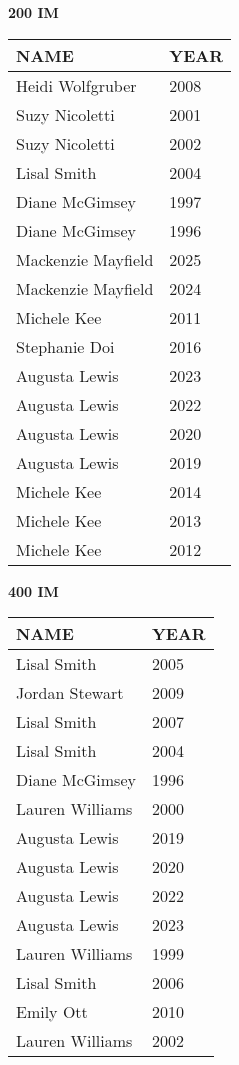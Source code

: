\vspace{0.4cm}

\begin{minipage}[t]{0.48\textwidth}
\centering
\textbf{200 IM}\\[0.05cm]
\begin{tabular}{@{}p{2.8cm}p{1.2cm}@{}}
\hline
\textbf{NAME} & \textbf{YEAR} \\
\hline
Heidi Wolfgruber & 2008 \\
Suzy Nicoletti & 2001 \\
Suzy Nicoletti & 2002 \\
Lisal Smith & 2004 \\
Diane McGimsey & 1997 \\
Diane McGimsey & 1996 \\
Mackenzie Mayfield & 2025 \\
Mackenzie Mayfield & 2024 \\
Michele Kee & 2011 \\
Stephanie Doi & 2016 \\
Augusta Lewis & 2023 \\
Augusta Lewis & 2022 \\
Augusta Lewis & 2020 \\
Augusta Lewis & 2019 \\
Michele Kee & 2014 \\
Michele Kee & 2013 \\
Michele Kee & 2012 \\
\hline
\end{tabular}
\end{minipage}\hfill
\begin{minipage}[t]{0.48\textwidth}
\centering
\textbf{400 IM}\\[0.05cm]
\begin{tabular}{@{}p{2.8cm}p{1.2cm}@{}}
\hline
\textbf{NAME} & \textbf{YEAR} \\
\hline
Lisal Smith & 2005 \\
Jordan Stewart & 2009 \\
Lisal Smith & 2007 \\
Lisal Smith & 2004 \\
Diane McGimsey & 1996 \\
Lauren Williams & 2000 \\
Augusta Lewis & 2019 \\
Augusta Lewis & 2020 \\
Augusta Lewis & 2022 \\
Augusta Lewis & 2023 \\
Lauren Williams & 1999 \\
Lisal Smith & 2006 \\
Emily Ott & 2010 \\
Lauren Williams & 2002 \\
\hline
\end{tabular}
\end{minipage}

